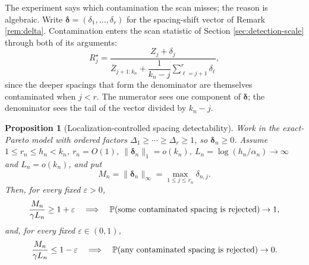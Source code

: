 \documentclass[11pt]{article}
\newtheorem{proposition}{Proposition}
\newcommand{\Pp}{\mathbb{P}}
\begin{document}
The experiment says which contamination the scan misses; the reason is
algebraic.  Write $\boldsymbol\delta=(\delta_1,\ldots,\delta_r)$ for the
spacing-shift vector of Remark \ref{rem:delta}.  Contamination enters the scan
statistic of Section \ref{sec:detection-scale} through both of its arguments:
\[
  R_j^\star
  =
  \frac{Z_j+\delta_j}
       {\overline Z_{j+1:k_n}
        +\dfrac1{k_n-j}\displaystyle\sum_{\ell=j+1}^{r}\delta_\ell},
\]
since the deeper spacings that form the denominator are themselves contaminated
when $j<r$.  The numerator sees one component of $\boldsymbol\delta$; the
denominator sees the tail of the vector divided by $k_n-j$.

\begin{proposition}[Localization-controlled spacing detectability]
\label{prop:localization}
Work in the exact-Pareto model with ordered factors
$\Delta_1\ge\cdots\ge\Delta_r\ge1$, so $\boldsymbol\delta_n\ge0$.  Assume
$1\le r_n\le h_n<k_n$, $r_n=O(1)$, $\|\boldsymbol\delta_n\|_1=o(k_n)$,
$L_n=\log(h_n/\alpha_n)\to\infty$ and $L_n=o(k_n)$, and put
\[
  M_n=\|\boldsymbol\delta_n\|_\infty=\max_{1\le j\le r_n}\delta_{n,j}.
\]
Then, for every fixed $\varepsilon>0$,
\[
  \frac{M_n}{\gamma L_n}\ge1+\varepsilon
  \quad\Longrightarrow\quad
  \Pp(\hbox{some contaminated spacing is rejected})\to1,
\]
and, for every fixed $\varepsilon\in(0,1)$,
\[
  \frac{M_n}{\gamma L_n}\le1-\varepsilon
  \quad\Longrightarrow\quad
  \Pp(\hbox{any contaminated spacing is rejected})\to0.
\]
\end{proposition}
\end{document}
